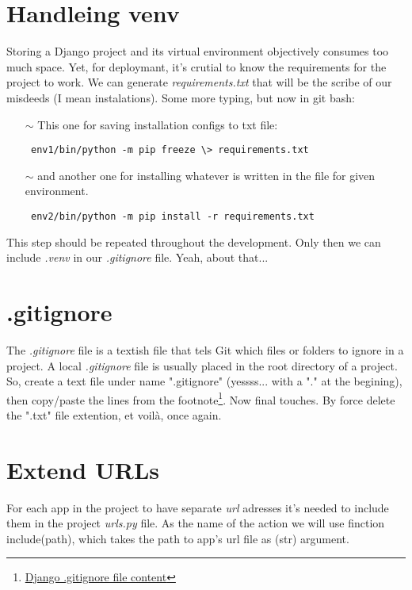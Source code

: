 \documentclass[12pt,a4paper]{article}
\begin{document}
\section{Handleing venv}
Storing a Django project and its virtual environment objectively consumes too much space.
Yet, for deploymant, it's crutial to know the requirements for the project to work.
We can generate \textit{requirements.txt} that will be the scribe of our misdeeds (I mean instalations).
Some more typing, but now in git bash:\\
\begin{itemize}
\item[$\sim$] This one for saving installation configs to txt file:\\
\begin{verbatim} env1/bin/python -m pip freeze \> requirements.txt\end{verbatim}
\item[$\sim$] and another one for installing whatever is written in the file for given environment.
\begin{verbatim} env2/bin/python -m pip install -r requirements.txt\end{verbatim}
\end{itemize}
This step should be repeated throughout the development.
Only then we can include \textit{.venv} in our \textit{.gitignore} file.
Yeah, about that...

\section{.gitignore}
The \textit{.gitignore} file is a textish file that tels Git which files or folders to ignore in a project.
A local \textit{.gitignore} file is usually placed in the root directory of a project.
So, create a text file under name ".gitignore" (yessss... with a "." at the begining), then copy/paste the lines from the footnote\footnote{\href{https://djangowaves.com/tips-tricks/gitignore-for-a-django-project/}{Django .gitignore file content}}.
Now final touches.
By force delete the ".txt" file extention, et voilà, once again.

\section{Extend URLs}
For each app in the project to have separate \textit{url} adresses it's needed to include them in the project \textit{urls.py} file. As the name of the action we will use finction {\color{violet} include(path)}, which takes the path to app's url file as (str) argument.
\end{document}
